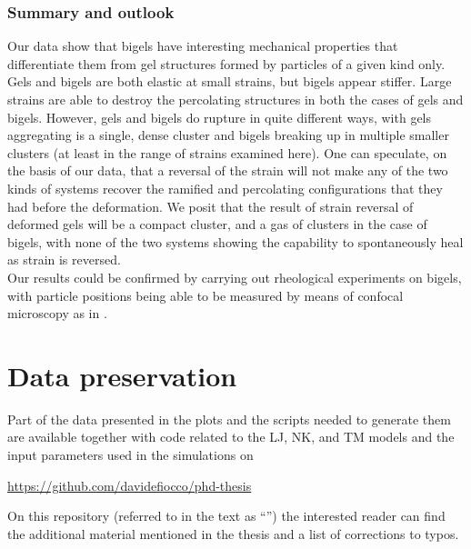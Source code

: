 \subsection*{Summary and outlook}

Our data show that bigels have interesting mechanical properties that differentiate them from gel structures formed by particles of a given kind only. Gels and bigels are both elastic at small strains, but bigels appear stiffer. Large strains are able to destroy the percolating structures in both the cases of gels and bigels. However, gels and bigels do rupture in quite different ways, with gels aggregating is a single, dense cluster and bigels breaking up in multiple smaller clusters (at least in the range of strains examined here).
One can speculate, on the basis of our data, that a reversal of the strain will not make any of the two kinds of systems recover the ramified and percolating configurations that they had before the deformation. We posit that the result of strain reversal of deformed gels will be a compact cluster, and a gas of clusters in the case of bigels, with none of the two systems showing the capability to spontaneously heal as strain is reversed.\\
Our results could be confirmed by carrying out rheological experiments on bigels, with particle positions being able to be measured by means of confocal microscopy as in \cite{varrato2012arrested}.

\chapter{Data preservation \label{app:DataPreservation}}

Part of the data presented in the plots and the scripts needed to generate them are available together with code related to the LJ, NK, and TM models and the input parameters used in the simulations on\\

\centerline{\url{https://github.com/davidefiocco/phd-thesis}}

On this repository (referred to in the text as ``\cite{mygithub}'') the interested reader can find the additional material mentioned in the thesis and a list of corrections to typos.

